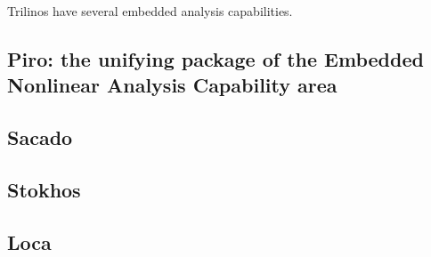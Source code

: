 
Trilinos have several embedded analysis capabilities.

\subsection{Piro: the unifying package of the Embedded Nonlinear Analysis Capability area}

\subsection{Sacado}

\subsection{Stokhos}

\subsection{Loca}

